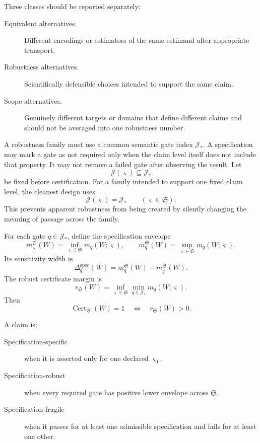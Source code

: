 Three classes should be reported separately:
\begin{description}
\item[Equivalent alternatives.] Different encodings or estimators of the same
 estimand after appropriate transport.
\item[Robustness alternatives.] Scientifically defensible choices intended to
 support the same claim.
\item[Scope alternatives.] Genuinely different targets or domains that define
 different claims and should not be averaged into one robustness number.
\end{description}


A robustness family must use a common semantic gate index
\(\mathcal J_*\). A specification may mark a gate as not required only when the
claim level itself does not include that property. It may not remove a failed
gate after observing the result. Let
\[
\mathcal J(\varsigma)\subseteq\mathcal J_*
\]
be fixed before certification. For a family intended to support one fixed
claim level, the cleanest design uses
\[
\mathcal J(\varsigma)=\mathcal J_*
\qquad
(\varsigma\in\mathfrak S).
\]
This prevents apparent robustness from being created by silently changing the
meaning of passage across the family.


For each gate \(q\in\mathcal J_*\), define the specification envelope
\[
\boxed{
\underline m_q^{\mathfrak S}(W)
=
\inf_{\varsigma\in\mathfrak S}m_q(W;\varsigma),
\qquad
\overline m_q^{\mathfrak S}(W)
=
\sup_{\varsigma\in\mathfrak S}m_q(W;\varsigma).
}
\]
Its sensitivity width is
\[
\Delta_q^{\mathrm{spec}}(W)
=
\overline m_q^{\mathfrak S}(W)
-
\underline m_q^{\mathfrak S}(W).
\]
The robust certificate margin is
\[
\boxed{
r_{\mathfrak S}(W)
=
\inf_{\varsigma\in\mathfrak S}
\min_{q\in\mathcal J_*}m_q(W;\varsigma).
}
\]
Then
\[
\operatorname{Cert}_{\mathfrak S}(W)=1
\quad\Longleftrightarrow\quad
r_{\mathfrak S}(W)>0.
\]

\begin{definition}
A claim is:
\begin{description}
\item[Specification-specific] when it is asserted only for one declared
 \(\varsigma_0\).
\item[Specification-robust] when every required gate has positive lower
 envelope across \(\mathfrak S\).
\item[Specification-fragile] when it passes for at least one admissible
 specification and fails for at least one other.
\end{description}
\end{definition}

